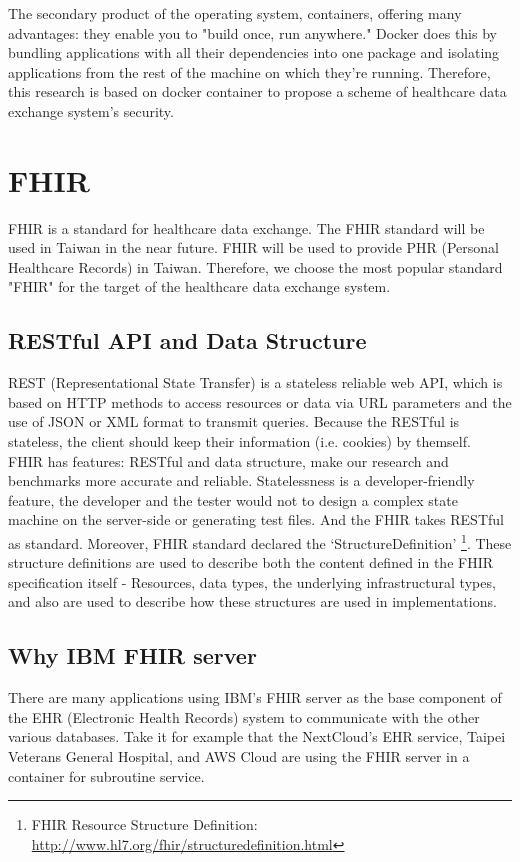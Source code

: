 The secondary product of the operating system, containers, offering many advantages:
they enable you to "build once, run anywhere." Docker does this by bundling
applications with all their dependencies into one package and isolating applications
from the rest of the machine on which they're running. Therefore, this research
is based on docker container to propose a scheme of healthcare data exchange system's
security.

\section{FHIR}
FHIR is a standard for healthcare data exchange. The FHIR standard will be used in
Taiwan in the near future. FHIR will be used to provide PHR (Personal Healthcare Records)
in Taiwan. Therefore, we choose the most popular standard "FHIR" for the target of
the healthcare data exchange system.

\subsection{RESTful API and Data Structure}
REST (Representational State Transfer) is a stateless reliable web API, which is based
on HTTP methods to access resources or data via URL parameters and the use of JSON or
XML format to transmit queries. Because the RESTful is stateless, the client should
keep their information (i.e. cookies) by themself.\\


FHIR has features: RESTful and data structure, make our research and benchmarks more accurate
and reliable.
Statelessness is a developer-friendly feature, the developer and the tester would not
to design a complex state machine on the server-side or generating test files. And the FHIR
takes RESTful as standard. Moreover, FHIR standard declared the `StructureDefinition'
\footnote{FHIR Resource Structure Definition: \url{http://www.hl7.org/fhir/structuredefinition.html}}.
These structure definitions are used to describe both the content defined in the FHIR
specification itself - Resources, data types, the underlying infrastructural types, and
also are used to describe how these structures are used in implementations.

\subsection{Why IBM FHIR server}
There are many applications using IBM's FHIR server as the base component of the EHR
(Electronic Health Records) system to communicate with the other various databases.
Take it for example that the NextCloud's EHR service, Taipei Veterans General Hospital,
and AWS Cloud are using the FHIR server in a container for subroutine service.\\

